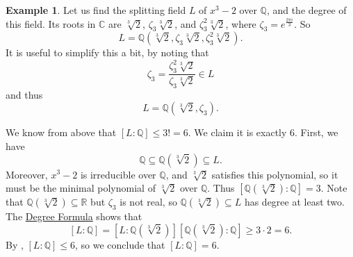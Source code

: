\documentclass[12pt]{report}
\numberwithin{equation}{section}
\numberwithin{theorem}{chapter}
\theoremstyle{definition}
\newtheorem{example}[theorem]{Example}
\newtheorem*{basic properties}{Basic Properties}
\newtheorem*{Important Remark}{Important Remark}
\newcommand{\C}{\mathbb{C}}
\begin{document}
\begin{example}\label{example splitting field x3-2}
Let us find the splitting field $L$ of $x^3 -2$ over $\mathbb{Q}$, and the degree of this field.
Its roots in $\C$ are $\sqrt[3]{2}$, $\zeta_3 \sqrt[3]{2}$, and $\zeta_3^2 \sqrt[3]{2}$, where $\zeta_3 = e^{\frac{2 \pi i}{3}}$.
So
$$L = \mathbb{Q}(\sqrt[3]{2}, \zeta_3 \sqrt[3]{2}, \zeta_3^2 \sqrt[3]{2}).$$
It is useful to simplify this a bit, by noting that 
$$\zeta_3 = \frac{\zeta_3^2 \sqrt[3]{2}}{\zeta_3 \sqrt[3]{2}} \in L$$
and thus
$$L = \mathbb{Q}(\sqrt[3]{2}, \zeta_3).$$

We know from  above that $[L: \mathbb{Q}] \leqslant 3! = 6$. We claim it is exactly $6$. First, we have
$$\mathbb{Q} \subseteq \mathbb{Q}(\sqrt[3]{2}) \subseteq L.$$
Moreover, $x^3 - 2$ is irreducible over $\mathbb{Q}$, and $\sqrt[3]{2}$ satisfies this polynomial, so it must be the minimal polynomial of $\sqrt[3]{2}$ over $\mathbb{Q}$. Thus $[\mathbb{Q}(\sqrt[3]{2}): \mathbb{Q}] = 3$.
Note that $\mathbb{Q}(\sqrt[3]{2}) \subseteq \mathbb{R}$ but $\zeta_3$ is not real, so $\mathbb{Q}(\sqrt[3]{2}) \subseteq L$ has degree at least two. The \hyperref[deg formula]{Degree Formula} shows that 
$$[L:\mathbb{Q}] =  [L : \mathbb{Q}(\sqrt[3]{2})] [\mathbb{Q}(\sqrt[3]{2}): \mathbb{Q}] \geqslant 3 \cdot 2= 6.$$
By , $[L:\mathbb{Q}] \leqslant 6$, so we conclude that $[L:\mathbb{Q}] = 6$.

\end{example}
\end{document}
